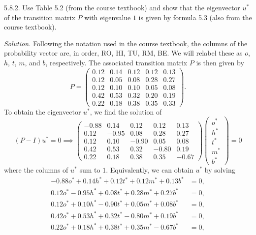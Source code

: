 \documentclass{article}
\begin{document}
5.8.2. Use Table 5.2 (from the course textbook) and show that the eigenvector
$u^*$ of the transition matrix $P$ with eigenvalue $1$ is given by formula 5.3
(also from the course textbook).

\textit{Solution.}
Following the notation used in the course textbook, the columns of the
probability vector are, in order, RO, HI, TU, RM, BE. We will relabel
these as $o$, $h$, $t$, $m$, and $b$, respectively. The associated
transition matrix $P$ is then given by
%
\begin{equation*}
    P =
    \begin{pmatrix}
        0.12 & 0.14 & 0.12 & 0.12 & 0.13 \\
        0.12 & 0.05 & 0.08 & 0.28 & 0.27 \\
        0.12 & 0.10 & 0.10 & 0.05 & 0.08 \\
        0.42 & 0.53 & 0.32 & 0.20 & 0.19 \\
        0.22 & 0.18 & 0.38 & 0.35 & 0.33
    \end{pmatrix}
    .
\end{equation*}
%
To obtain the eigenvector $u^*$, we find the solution of
%
\begin{equation*}
    (P - I) u^* = 0
    \implies
    \begin{pmatrix}
        - 0.88 & 0.14 & 0.12 & 0.12 & 0.13 \\
        0.12 & - 0.95 & 0.08 & 0.28 & 0.27 \\
        0.12 & 0.10 & - 0.90 & 0.05 & 0.08 \\
        0.42 & 0.53 & 0.32 & - 0.80 & 0.19 \\
        0.22 & 0.18 & 0.38 & 0.35 & - 0.67
    \end{pmatrix}
    \begin{pmatrix}
        o^* \\
        h^* \\
        t^* \\
        m^* \\
        b^*
    \end{pmatrix}
    = 0
\end{equation*}
%
where the columns of $u^*$ sum to $1$.
Equivalently, we can obtain $u^*$ by solving
%
\begin{align*}
    - 0.88 o^* + 0.14 h^* + 0.12 t^* + 0.12 m^* + 0.13 b^* &= 0, \\
    0.12 o^* - 0.95  h^* + 0.08 t^* + 0.28 m^* + 0.27 b^* &= 0, \\
    0.12 o^* + 0.10  h^* - 0.90 t^* + 0.05 m^* + 0.08 b^* &= 0, \\
    0.42 o^* + 0.53  h^* + 0.32 t^* - 0.80 m^* + 0.19 b^* &= 0, \\
    0.22 o^* + 0.18  h^* + 0.38 t^* + 0.35 m^* - 0.67 b^* &= 0,
\end{align*}
\end{document}
